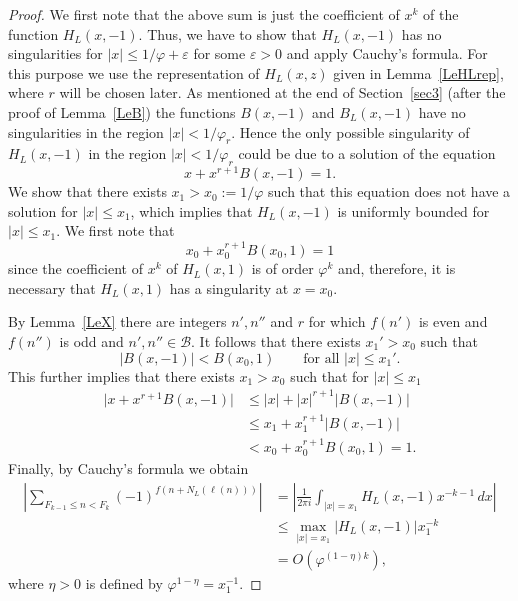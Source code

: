 \documentclass[12pt]{amsart}
\begin{document}
\begin{proof}
We first note that the above sum is just the coefficient of $x^k$ of the function $H_L(x,-1)$.
Thus, we have to show that $H_L(x,-1)$ has no singularities for $\lvert x\rvert \leq 1/\varphi+\varepsilon$ for some $\varepsilon>0$ and apply Cauchy's formula.
For this purpose we use the representation of $H_L(x,z)$ given in Lemma~\ref{LeHLrep}, where $r$ will be chosen later.
As mentioned at the end of Section~\ref{sec3} (after the proof of Lemma~\ref{LeB}) the functions $B(x,-1)$ and $B_L(x,-1)$ have no singularities in the region $\lvert x\rvert< 1/\varphi_r$.
Hence the only possible singularity of $H_L(x,-1)$ in the region $\lvert x\rvert <1/\varphi_r$ could be due to a solution of the equation 
\begin{equation}\label{eqzero}
x+x^{r+1} B(x,-1) = 1.
\end{equation}
We show that there exists $x_1>x_0 := 1/\varphi$ such that this equation does not have a solution for $\lvert x\rvert\leq x_1$, which implies that $H_L(x,-1)$ is uniformly bounded for $\lvert x\rvert\leq x_1$.
We first note that 
\[
x_0 + x_0^{r+1} B(x_0,1) = 1
\]
since the coefficient of $x^k$ of $H_L(x,1)$ is of order $\varphi^{k}$ and, therefore, it is necessary that $H_L(x,1)$ has a singularity at $x=x_0$.

By Lemma~\ref{LeX} there are integers $n', n''$ and $r$ for which $f(n')$ is even and $f(n'')$ is odd and $n',n''\in\mathcal B$.
It follows that there exists $x_1'>x_0$ such that
\begin{equation}\label{eqtoshow}
|B(x,-1)| < B(x_0,1)  \qquad \mbox{for all $|x|\le x_1'$.}
\end{equation}
This further implies that there exists $x_1>x_0$ such that for $\lvert x\rvert\leq x_1$
\begin{align*}
\lvert x+x^{r+1}B(x,-1)\rvert&\leq \lvert x\rvert+\lvert x\rvert^{r+1}\lvert B(x,-1)\rvert\\
&\leq x_1+x_1^{r+1}\lvert B(x,-1)\rvert\\
&< x_0+x_0^{r+1}B(x_0,1)=1.
\end{align*}
Finally, by Cauchy's formula we obtain
\begin{align*}
\left|\sum_{F_{k-1}\le n < F_k} (-1)^{f(n+N_L(\ell(n)))} \right|
&= \left| \frac 1{2\pi i} \int_{|x|= x_1} H_L(x,-1) x^{-k-1}\, dx \right| \\
&\le \max_{|x| = x_1} |H_L(x,-1)| x_1^{-k} \\
&= O\left( \varphi^{(1-\eta) k} \right),
\end{align*}
where $\eta> 0$ is defined by $\varphi^{1-\eta} = x_1^{-1}$.
\end{proof}
\end{document}
